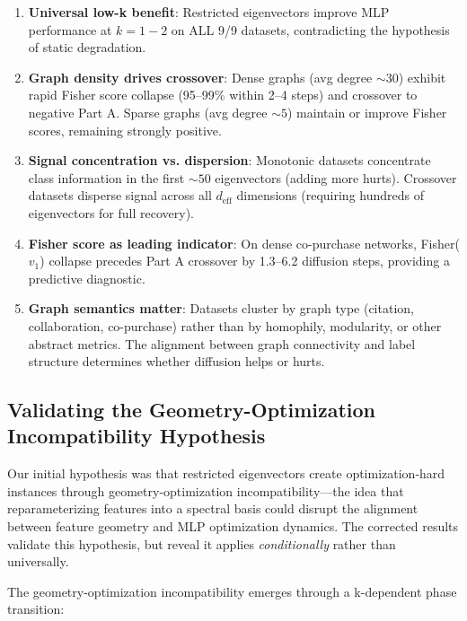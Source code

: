 \documentclass[11pt]{article}
\begin{document}
\begin{enumerate}
\item \textbf{Universal low-k benefit}: Restricted eigenvectors improve MLP performance at $k{=}1{-}2$ on ALL 9/9 datasets, contradicting the hypothesis of static degradation.

\item \textbf{Graph density drives crossover}: Dense graphs (avg degree ${\sim}30$) exhibit rapid Fisher score collapse (95--99\% within 2--4 steps) and crossover to negative Part A. Sparse graphs (avg degree ${\sim}5$) maintain or improve Fisher scores, remaining strongly positive.

\item \textbf{Signal concentration vs. dispersion}: Monotonic datasets concentrate class information in the first ${\sim}50$ eigenvectors (adding more hurts). Crossover datasets disperse signal across all $d_{\text{eff}}$ dimensions (requiring hundreds of eigenvectors for full recovery).

\item \textbf{Fisher score as leading indicator}: On dense co-purchase networks, Fisher($v_1$) collapse precedes Part A crossover by 1.3--6.2 diffusion steps, providing a predictive diagnostic.

\item \textbf{Graph semantics matter}: Datasets cluster by graph type (citation, collaboration, co-purchase) rather than by homophily, modularity, or other abstract metrics. The alignment between graph connectivity and label structure determines whether diffusion helps or hurts.
\end{enumerate}

\subsection{Validating the Geometry-Optimization Incompatibility Hypothesis}

Our initial hypothesis was that restricted eigenvectors create optimization-hard instances through geometry-optimization incompatibility—the idea that reparameterizing features into a spectral basis could disrupt the alignment between feature geometry and MLP optimization dynamics. The corrected results validate this hypothesis, but reveal it applies \emph{conditionally} rather than universally.

The geometry-optimization incompatibility emerges through a k-dependent phase transition:
\end{document}
